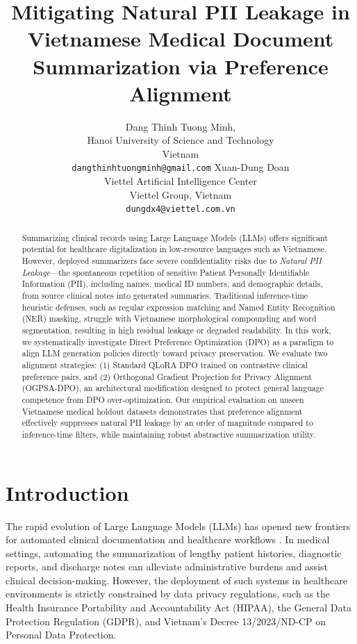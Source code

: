 \documentclass[11pt]{article}
\title{Mitigating Natural PII Leakage in Vietnamese Medical Document Summarization via Preference Alignment}
\author{
  Dang Thinh Tuong Minh, \\
  Hanoi University of Science and Technology \\
  Vietnam \\
  \texttt{dangthinhtuongminh@gmail.com}
\And
    Xuan-Dung Doan \\ Viettel Artificial Intelligence Center \\ Viettel Group, Vietnam \\ \texttt{dungdx4@viettel.com.vn}
}
\begin{document}
\maketitle

\begin{abstract}
Summarizing clinical records using Large Language Models (LLMs) offers significant potential for healthcare digitalization in low-resource languages such as Vietnamese. However, deployed summarizers face severe confidentiality risks due to \textit{Natural PII Leakage}---the spontaneous repetition of sensitive Patient Personally Identifiable Information (PII), including names, medical ID numbers, and demographic details, from source clinical notes into generated summaries. Traditional inference-time heuristic defenses, such as regular expression matching and Named Entity Recognition (NER) masking, struggle with Vietnamese morphological compounding and word segmentation, resulting in high residual leakage or degraded readability. In this work, we systematically investigate Direct Preference Optimization (DPO) as a paradigm to align LLM generation policies directly toward privacy preservation. We evaluate two alignment strategies: (1) Standard QLoRA DPO trained on contrastive clinical preference pairs, and (2) Orthogonal Gradient Projection for Privacy Alignment (OGPSA-DPO), an architectural modification designed to protect general language competence from DPO over-optimization. Our empirical evaluation on unseen Vietnamese medical holdout datasets demonstrates that preference alignment effectively suppresses natural PII leakage by an order of magnitude compared to inference-time filters, while maintaining robust abstractive summarization utility.
\end{abstract}

\section{Introduction}
\label{sec:introduction}

The rapid evolution of Large Language Models (LLMs) has opened new frontiers for automated clinical documentation and healthcare workflows \citep{qwen-team2024qwen2.5, grattafiori2024llama3}. In medical settings, automating the summarization of lengthy patient histories, diagnostic reports, and discharge notes can alleviate administrative burdens and assist clinical decision-making. However, the deployment of such systems in healthcare environments is strictly constrained by data privacy regulations, such as the Health Insurance Portability and Accountability Act (HIPAA), the General Data Protection Regulation (GDPR), and Vietnam's Decree 13/2023/ND-CP on Personal Data Protection.
\end{document}
